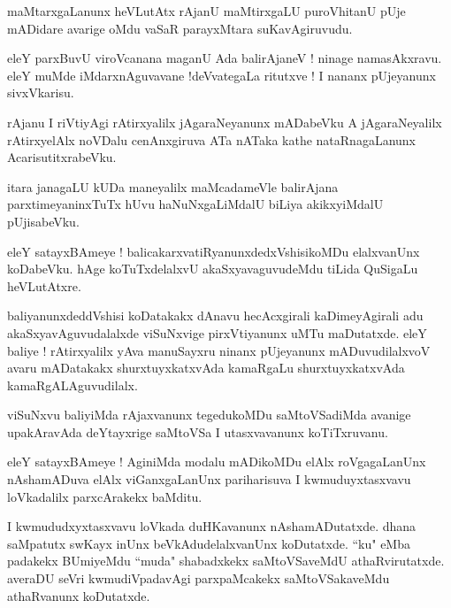\documentclass{article}
\begin{document}
\begin{mn}%
maMtarxgaLanunx heVLutAtx rAjanU maMtirxgaLU puroVhitanU pUje mADidare avarige oMdu vaSaR 
parayxMtara suKavAgiruvudu.
\end{mn}

\begin{mn}%
eleY parxBuvU viroVcanana maganU Ada balirAjaneV ! ninage namasAkxravu. eleY muMde 
iMdarxnAguvavane !deVvategaLa ritutxve ! I nananx pUjeyanunx sivxVkarisu.
\end{mn}

\begin{mn}%
rAjanu I riVtiyAgi rAtirxyalilx jAgaraNeyanunx mADabeVku A jAgaraNeyalilx rAtirxyelAlx noVDalu 
cenAnxgiruva ATa nATaka kathe nataRnagaLanunx AcarisutitxrabeVku.
\end{mn}

\begin{mn}%
itara janagaLU kUDa maneyalilx maMcadameVle balirAjana parxtimeyaninxTuTx hUvu haNuNxgaLiMdalU 
biLiya akikxyiMdalU pUjisabeVku.
\end{mn}

\begin{mn}%
eleY satayxBAmeye ! balicakarxvatiRyanunxdedxVshisikoMDu elalxvanUnx koDabeVku. hAge 
koTuTxdelalxvU akaSxyavaguvudeMdu tiLida QuSigaLu heVLutAtxre.
\end{mn}

\begin{mn}%
baliyanunxdeddVshisi koDatakakx dAnavu hecAcxgirali kaDimeyAgirali adu akaSxyavAguvudalalxde 
viSuNxvige pirxVtiyanunx uMTu maDutatxde. eleY baliye ! rAtirxyalilx yAva manuSayxru ninanx 
pUjeyanunx mADuvudilalxvoV avaru mADatakakx shurxtuyxkatxvAda kamaRgaLu shurxtuyxkatxvAda 
kamaRgALAguvudilalx.
\end{mn}

\begin{mn}%
viSuNxvu baliyiMda rAjaxvanunx tegedukoMDu saMtoVSadiMda avanige upakAravAda deYtayxrige saMtoVSa 
I utasxvavanunx koTiTxruvanu.
\end{mn}

\begin{mn}%
eleY satayxBAmeye ! AginiMda modalu mADikoMDu elAlx roVgagaLanUnx nAshamADuva elAlx viGanxgaLanUnx 
pariharisuva I kwmuduyxtasxvavu loVkadalilx parxcArakekx baMditu.
\end{mn}

\begin{mn}%
I kwmududxyxtasxvavu loVkada duHKavanunx nAshamADutatxde. dhana saMpatutx swKayx inUnx 
beVkAdudelalxvanUnx koDutatxde. ``ku" eMba padakekx BUmiyeMdu ``muda" shabadxkekx saMtoVSaveMdU 
athaRvirutatxde. averaDU seVri kwmudiVpadavAgi parxpaMcakekx saMtoVSakaveMdu athaRvanunx 
koDutatxde.
\end{mn}
\end{document}
